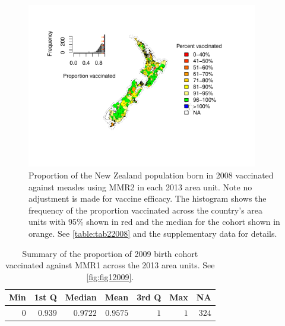 \documentclass{article}
\begin{document}
\begin{figure}
\begin{center}
    \includegraphics[width=0.9\textwidth]{nir_census_MMR2_NIR_2008.pdf}
 \end{center}
    \caption{Proportion of the New Zealand population born in 2008 vaccinated against measles using MMR2 in each 2013 area unit. Note no adjustment is made for vaccine efficacy. The histogram shows the frequency of the proportion vaccinated across the country's area units with 95\% shown in red and the median for the cohort shown in orange. See \autoref{table:tab22008} and the supplementary data for details.}
\label{fig:fig22008}
\end{figure}

 \vspace{5mm} %
\begin{table}
\begin{center}
\begin{tabular}{rrrrrrr}
\hline\hline
\multicolumn{1}{c}{Min}&\multicolumn{1}{c}{1st Q}&\multicolumn{1}{c}{Median}&\multicolumn{1}{c}{Mean}&\multicolumn{1}{c}{3rd Q}&\multicolumn{1}{c}{Max}&\multicolumn{1}{c}{NA}\tabularnewline
\hline
$0$&$0.939$&$0.9722$&$0.9575$&$1$&$1$&$324$\tabularnewline
\hline
\end{tabular}\end{center}\caption{Summary of the proportion of 2009 birth cohort vaccinated against MMR1 across the 2013 area units. See \autoref{fig:fig12009}.}
\label{table:tab12009}
\end{table}
\end{document}
